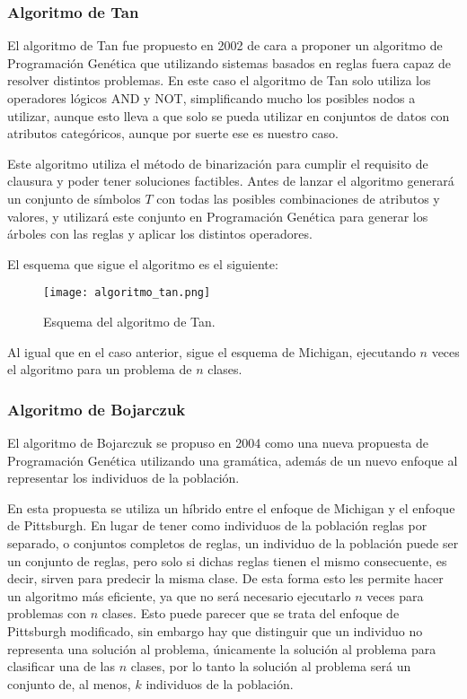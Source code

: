 \subsubsection{Algoritmo de Tan}

El algoritmo de Tan \cite{algoritmoTan} fue propuesto en 2002 de cara a proponer un algoritmo de Programación Genética que utilizando sistemas basados en reglas fuera capaz de resolver distintos problemas. En este caso el algoritmo de Tan solo utiliza los operadores lógicos AND y NOT, simplificando mucho los posibles nodos a utilizar, aunque esto lleva a que solo se pueda utilizar en conjuntos de datos con atributos categóricos, aunque por suerte ese es nuestro caso.

Este algoritmo utiliza el método de binarización para cumplir el requisito de clausura y poder tener soluciones factibles. Antes de lanzar el algoritmo generará un conjunto de símbolos $T$ con todas las posibles combinaciones de atributos y valores, y utilizará este conjunto en Programación Genética para generar los árboles con las reglas y aplicar los distintos operadores.

El esquema que sigue el algoritmo es el siguiente:

\begin{figure}[H]
    \centering
	  \texttt{[image: algoritmo\_tan.png]}
    \caption{Esquema del algoritmo de Tan.}
	 \label{fig:algoritmo_tan}
\end{figure}

Al igual que en el caso anterior, sigue el esquema de Michigan, ejecutando $n$ veces el algoritmo para un problema de $n$ clases.

\newpage

\subsubsection{Algoritmo de Bojarczuk}


El algoritmo de Bojarczuk \cite{algoritmoBojarczuk} se propuso en 2004 como una nueva propuesta de Programación Genética utilizando una gramática, además de un nuevo enfoque al representar los individuos de la población.

En esta propuesta se utiliza un híbrido entre el enfoque de Michigan y el enfoque de Pittsburgh. En lugar de tener como individuos de la población reglas por separado, o conjuntos completos de reglas, un individuo de la población puede ser un conjunto de reglas, pero solo si dichas reglas tienen el mismo consecuente, es decir, sirven para predecir la misma clase. De esta forma esto les permite hacer un algoritmo más eficiente, ya que no será necesario ejecutarlo $n$ veces para problemas con $n$ clases. Esto puede parecer que se trata del enfoque de Pittsburgh modificado, sin embargo hay que distinguir que un individuo no representa una solución al problema, únicamente la solución al problema para clasificar una de las $n$ clases, por lo tanto la solución al problema será un conjunto de, al menos, $k$ individuos de la población.

